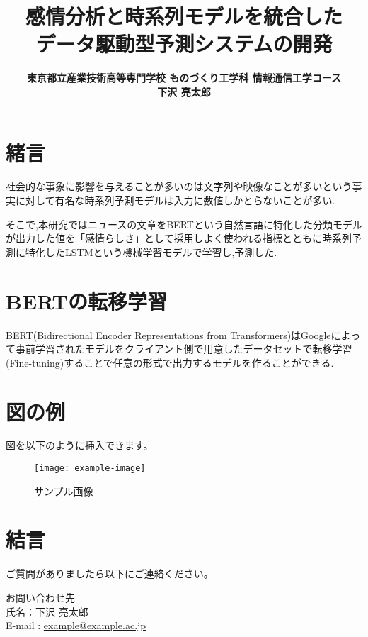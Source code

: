 \documentclass[a4paper,11pt]{article}
\title{{\TitleJFont\bfseries 感情分析と時系列モデルを統合した\\データ駆動型予測システムの開発 \\ }}
\author{\large\TitleJFont\bfseries 東京都立産業技術高等専門学校 ものづくり工学科 情報通信工学コース \\ \large\TitleJFont\bfseries 下沢 亮太郎}
\date{}
\newenvironment{customabstract}
{\noindent\hfuzz=10pt\hbadness=10000\begin{flushleft}\small}
{\end{flushleft}}
\begin{document}


\setlength{\columnsep}{40pt}

\twocolumn[
  \maketitle

  \vspace{-2em}
  \begin{customabstract}
  　キーワード : 機械学習 時系列予測 感情分析 BERT LSTM
  \end{customabstract}
]



\section{緒言}
社会的な事象に影響を与えることが多いのは文字列や映像なことが多いという事実に対して有名な時系列予測モデルは入力に数値しかとらないことが多い.

そこで,本研究ではニュースの文章をBERTという自然言語に特化した分類モデルが出力した値を「感情らしさ」として採用しよく使われる指標とともに時系列予測に特化したLSTMという機械学習モデルで学習し,予測した.

\section{BERTの転移学習}
BERT(Bidirectional Encoder Representations from Transformers)はGoogleによって事前学習されたモデルをクライアント側で用意したデータセットで転移学習(Fine-tuning)することで任意の形式で出力するモデルを作ることができる.



\section{図の例}
図を以下のように挿入できます。
\begin{figure}[h]
    \centering
    \texttt{[image: example-image]} %
    \caption{サンプル画像}
\end{figure}

\section{結言}
ご質問がありましたら以下にご連絡ください。

\noindent
{}
お問い合わせ先\\
氏名：下沢 亮太郎 \\
E-mail : \href{mailto:example@example.ac.jp}{example@example.ac.jp}

\end{document}
